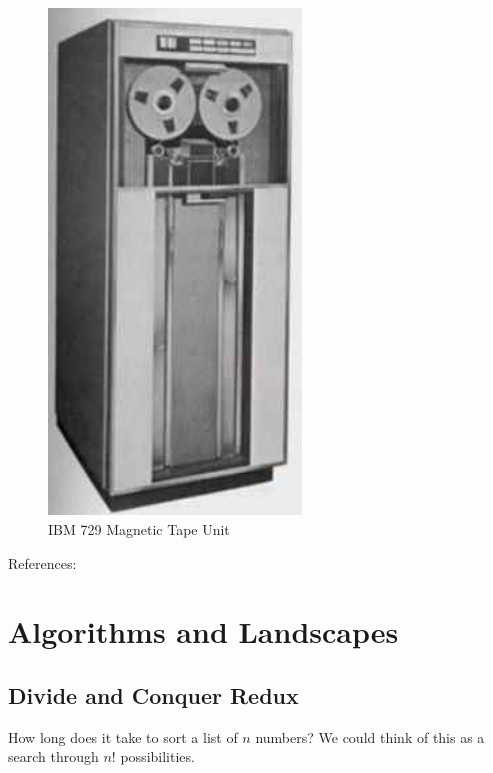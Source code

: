 \documentclass[]{article}
\begin{document}
\begin{figure}[H]
	\begin{center}
		\caption{IBM 729 Magnetic Tape Unit}\label{fig:imb729mtu}
		\includegraphics[width=0.6\textwidth]{imb729mtu}
	\end{center}
\end{figure}

References: \cite[Chapters 1,2,4]{moore2011nature}

\section{Algorithms and Landscapes}


\subsection{Divide and Conquer Redux}

How long does it take to sort a list of $n$ numbers? We could think of this as a search through $n!$ possibilities.
\end{document}
